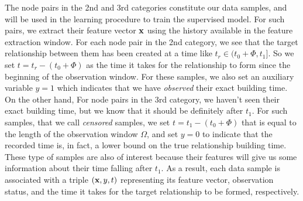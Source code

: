 The node pairs in the 2nd and 3rd categories constitute our data samples, and will be used in the learning procedure to train the supervised model. For such pairs, we extract their feature vector $\mathbf{x}$ using the history available in the feature extraction window. For each node pair in the 2nd category, we see that the target relationship between them has been created at a time like $t_r\in(t_0+\Phi,t_1]$. So we set $t=t_r-(t_0+\Phi)$ as the time it takes for the relationship to form since the beginning of the observation window. For these samples, we also set an auxiliary variable $y=1$ which indicates that we have \emph{observed} their exact building time. On the other hand, For node pairs in the 3rd category, we haven't seen their exact building time, but we know that it should be definitely after $t_1$. For such samples, that we call \emph{censored} samples, we set $t=t_1-(t_0+\Phi)$ that is equal to the length of the observation window $\Omega$, and set $y=0$ to indicate that the recorded time is, in fact, a lower bound on the true relationship building time. These type of samples are also of interest because their features will give us some information about their time falling after $t_1$. As a result, each data sample is associated with a triple $(\mathbf{x},y,t)$ representing its feature vector, observation status, and the time it takes for the target relationship to be formed, respectively.

